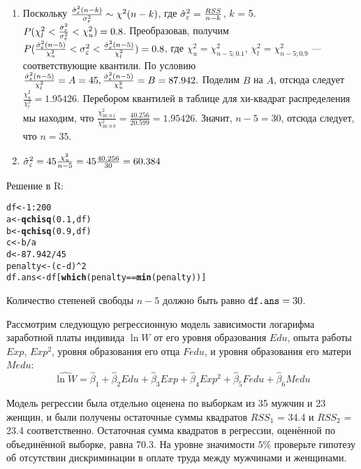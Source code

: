 \documentclass[pdftex,11pt,openany]{book}\usepackage[]{graphicx}\usepackage[]{color}
\makeatletter
\newcommand{\hlnum}[1]{\textcolor[rgb]{0.686,0.059,0.569}{#1}}%
\newcommand{\hlopt}[1]{\textcolor[rgb]{0,0,0}{#1}}%
\newcommand{\hlstd}[1]{\textcolor[rgb]{0.345,0.345,0.345}{#1}}%
\newcommand{\hlkwb}[1]{\textcolor[rgb]{0.69,0.353,0.396}{#1}}%
\newcommand{\hlkwd}[1]{\textcolor[rgb]{0.737,0.353,0.396}{\textbf{#1}}}%
\newenvironment{kframe}{%
 \def\at@end@of@kframe{}%
 \ifinner\ifhmode%
  \def\at@end@of@kframe{\end{minipage}}%
  \begin{minipage}{\columnwidth}%
 \fi\fi%
 \def\FrameCommand##1{\hskip\@totalleftmargin \hskip-\fboxsep
 \colorbox{shadecolor}{##1}\hskip-\fboxsep
     \hskip-\linewidth \hskip-\@totalleftmargin \hskip\columnwidth}%
 \MakeFramed {\advance\hsize-\width
   \@totalleftmargin\z@ \linewidth\hsize
   \@setminipage}}%
 {\par\unskip\endMakeFramed%
 \at@end@of@kframe}
\newenvironment{knitrout}{}{} %
\makeatother
\begin{document}
\begin{solution}
\begin{enumerate}
\item Поскольку $\frac{\hat{\sigma}_{\varepsilon}^2(n-k)}{\sigma_{\varepsilon}^2} \sim \chi ^2(n-k)$, где $\hat{\sigma}_{\varepsilon}^2 = \frac{RSS}{n-k}$, $k$ = 5. $P(\chi_{l}^2 < \frac{\hat{\sigma}_{\varepsilon}^2}{\sigma_{\varepsilon}^2} < \chi_{u}^2) = 0.8$. Преобразовав, получим $P(\frac{\hat{\sigma}_{\varepsilon}^2(n-5)}{\chi_{u}^2} < \sigma_{\varepsilon}^2 < \frac{\hat{\sigma}_{\varepsilon}^2(n-5)}{\chi_{l}^2}) = 0.8$, где $\chi_{u}^2 = \chi_{n-5; 0.1} ^2$, $\chi_{l}^2 = \chi_{n-5; 0.9} ^2$ --- соответствующие квантили. По условию $\frac{\hat{\sigma}_{\varepsilon}^2(n-5)}{\chi_{l}^2} = A = 45, \frac{\hat{\sigma}_{\varepsilon}^2(n-5)}{\chi_{u}^2} = B = 87.942.$ Поделим $B$ на $A$, отсюда следует $\frac{\chi_{u}^2}{\chi_{l}^2} = 1.95426.$ Перебором квантилей в таблице для хи-квадрат распределения мы находим, что $\frac{\chi_{30; 0.1}^2}{\chi_{30; 0.9}^2} = \frac{40.256}{20.599} = 1.95426.$ Значит, $n - 5 = 30$, отсюда следует, что $n = 35.$
\item $\hat{\sigma}_{\varepsilon}^2 = 45 \frac{\chi_{u}^2}{n-5} = 45 \frac{40.256}{30} = 60.384$ 
\end{enumerate}

Решение в R:
\begin{knitrout}
\color{fgcolor}\begin{kframe}
\begin{alltt}
\hlstd{df} \hlkwb{<-} \hlnum{1}\hlopt{:}\hlnum{200}
\hlstd{a} \hlkwb{<-} \hlkwd{qchisq}\hlstd{(}\hlnum{0.1}\hlstd{,df)}
\hlstd{b} \hlkwb{<-} \hlkwd{qchisq}\hlstd{(}\hlnum{0.9}\hlstd{,df)}
\hlstd{c} \hlkwb{<-} \hlstd{b}\hlopt{/}\hlstd{a}
\hlstd{d} \hlkwb{<-} \hlnum{87.942}\hlopt{/}\hlnum{45}
\hlstd{penalty} \hlkwb{<-} \hlstd{(c}\hlopt{-}\hlstd{d)}\hlopt{^}\hlnum{2}
\hlstd{df.ans} \hlkwb{<-} \hlstd{df[}\hlkwd{which}\hlstd{(penalty}\hlopt{==}\hlkwd{min}\hlstd{(penalty))]}
\end{alltt}
\end{kframe}
\end{knitrout}

Количество степеней свободы $n-5$ должно быть равно $\verb|df.ans|=30$.

\end{solution}

\begin{problem}
 Рассмотрим следующую регрессионную модель зависимости логарифма заработной платы индивида $\ln W$ от его уровня образования $Edu$, опыта работы $Exp$, $Exp^2$, уровня образования его отца $Fedu$, и уровня образования его матери $Medu$:
\[
\widehat{\ln W}=\hat{\beta}_1+\hat{\beta}_2Edu+\hat{\beta}_3Exp+\hat{\beta}_4Exp^2+\hat{\beta}_5Fedu+\hat{\beta}_6Medu
\]

Модель регрессии была отдельно оценена по выборкам из 35 мужчин и 23 женщин, и были получены остаточные суммы квадратов $RSS_1$ = 34.4 и $RSS_2$ = 23.4 соответственно. Остаточная сумма квадратов в регрессии, оценённой по объединённой выборке, равна 70.3. На уровне значимости $5\%$ проверьте гипотезу об отсутствии дискриминации в оплате труда между мужчинами и женщинами.
\end{problem}
\end{document}
